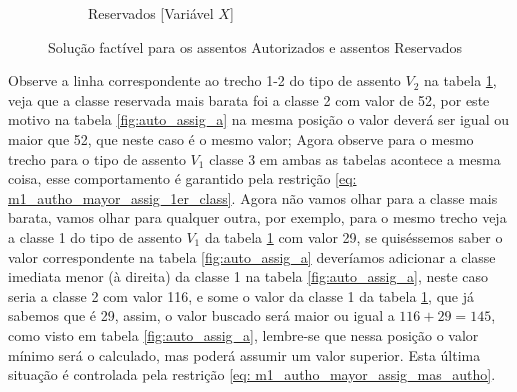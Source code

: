 \begin{figure}[h!]
\begin{subfigure}[b]{0.35\linewidth}
		\caption{Reservados [Variável $X$]}
		\label{fig:auto_assig_b}
	\end{subfigure}
	\caption{Solução factível para os assentos Autorizados e assentos Reservados}
	\label{fig:auto_assig}
\end{figure}

Observe a linha correspondente ao trecho 1-2 do tipo de assento $V_2$ na tabela \ref{fig:auto_assig_b}, veja que a classe reservada mais barata foi a classe 2 com valor de 52, por este motivo na tabela \ref{fig:auto_assig_a} na mesma posição o valor deverá ser igual ou maior que 52, que neste caso é o mesmo valor; Agora observe para o mesmo trecho para o tipo de assento $V_1$ classe 3 em ambas as tabelas acontece a mesma coisa, esse comportamento é garantido pela restrição \ref{eq: m1_autho_mayor_assig_1er_class}. Agora não vamos olhar para a classe mais barata, vamos olhar para qualquer outra, por exemplo, para o mesmo trecho veja a classe 1 do tipo de assento $V_1$ da tabela \ref{fig:auto_assig_b} com valor 29, se quiséssemos saber o valor correspondente na tabela \ref{fig:auto_assig_a} deveríamos adicionar a classe imediata menor (à direita) da classe 1 na tabela \ref{fig:auto_assig_a}, neste caso seria a classe 2 com valor 116, e some o valor da classe 1 da tabela \ref{fig:auto_assig_b}, que já sabemos que é 29, assim, o valor buscado será maior ou igual a $116+29 = 145$, como visto em tabela \ref{fig:auto_assig_a}, lembre-se que nessa posição o valor mínimo será o calculado, mas poderá assumir um valor superior. Esta última situação é controlada pela restrição \ref{eq: m1_autho_mayor_assig_mas_autho}.



